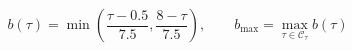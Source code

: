 \documentclass{article}
\begin{document}
\fontsize{22}{29}\selectfont
\[
b(\tau)=\min\left(\frac{\tau-0.5}{7.5},\frac{8-\tau}{7.5}\right),\qquad b_{\max}=\max_{\tau\in\mathcal C_\tau}b(\tau)
\]
\end{document}
